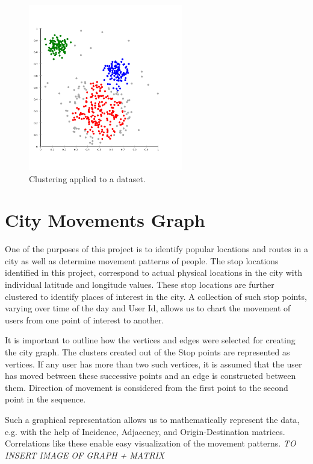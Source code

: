 \begin{figure}[!ht]
	\centering
	\includegraphics[width=0.6\textwidth]{images/clustering.png}
	\caption{ Clustering applied to a dataset. }
	\label{fig:clustering}
\end{figure} 

\FloatBarrier
\section{City Movements Graph}
One of the purposes of this project is to identify popular locations and routes in a city as well as determine movement patterns of people. The stop locations  identified in this project, correspond to actual physical locations in the city with individual latitude and longitude values. These stop locations are further clustered to identify places of interest in the city. A collection of such stop points, varying over time of the day and User Id, allows us to chart the movement of users from one point of interest to another. 

It is important to outline how the vertices and edges were selected for creating the city graph. The clusters created out of the Stop points are represented as vertices. If any user has more than two such vertices, it is assumed that the user has moved between these successive points and an edge is constructed between them. Direction of movement is considered from the first point to the second point in the sequence.

Such a graphical representation allows us to mathematically represent the data, e.g. with the help of Incidence, Adjacency, and Origin-Destination  matrices. Correlations like these enable easy visualization of the movement patterns. 
\textit{TO INSERT IMAGE OF GRAPH + MATRIX}

